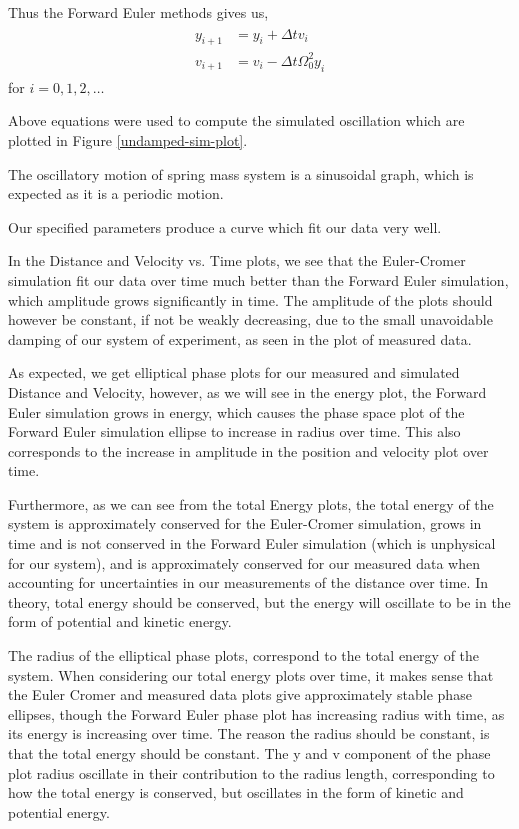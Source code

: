 \documentclass[letterpaper,12pt]{article}
\begin{document}
Thus the Forward Euler methods gives us,
\begin{eqnarray*}
  \begin{split}
    y_{i+1} &= y_i + \Delta t v_i \\
    v_{i+1} &= v_i -\Delta t \Omega_0^2 y_i
  \end{split}
\end{eqnarray*}
for $i = 0, 1, 2, \dots$

Above equations were used to compute the simulated oscillation which are plotted in Figure \ref{undamped-sim-plot}. 

The oscillatory motion of spring mass system is a sinusoidal graph, which is expected as it is a periodic motion.

Our specified parameters produce a curve which fit our data very well.

In the Distance and Velocity vs. Time plots, we see that the Euler-Cromer simulation fit our data over time much better than the Forward Euler simulation, which amplitude grows significantly in time. The amplitude of the plots should however be constant, if not be weakly decreasing, due to the small unavoidable damping of our system of experiment, as seen in the plot of measured data.

As expected, we get elliptical phase plots for our measured and simulated Distance and Velocity, however, as we will see in the energy plot, the Forward Euler simulation grows in energy, which causes the phase space plot of the Forward Euler simulation ellipse to increase in radius over time. This also corresponds to the increase in amplitude in the position and velocity plot over time.

Furthermore, as we can see from the total Energy plots, the total energy of the system is approximately conserved for the Euler-Cromer simulation, grows in time and is not conserved in the Forward Euler simulation (which is unphysical for our system), and is approximately conserved for our measured data when accounting for uncertainties in our measurements of the distance over time. In theory, total energy should be conserved, but the energy will oscillate to be in the form of potential and kinetic energy.

The radius of the elliptical phase plots, correspond to the total energy of the system. When considering our total energy plots over time, it makes sense that the Euler Cromer and measured data plots give approximately stable phase ellipses, though the Forward Euler phase plot has increasing radius with time, as its energy is increasing over time. The reason the radius should be constant, is that the total energy should be constant. The y and v component of the phase plot radius oscillate in their contribution to the radius length, corresponding to how the total energy is conserved, but oscillates in the form of kinetic and potential energy.
\end{document}
